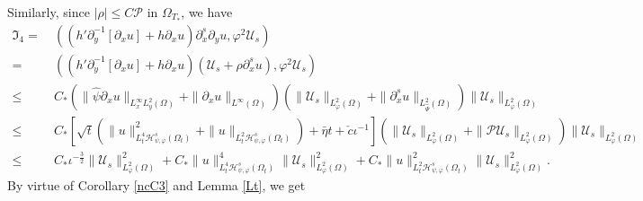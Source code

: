 \documentclass{amsart}
\numberwithin{equation}{section}
\begin{document}
Similarly, since $|\rho|\leq C\mathcal{P}$ in $\Omega_{T_{*}}$, we have
\begin{align*}
\mathfrak{I}_{4}
=&~((h'\partial_{y}^{-1}[\partial_{x}u]+h\partial_{x}u)\partial_{x}^{s}\partial_{y}u,\varphi^{2}\mathcal{U}_{s})\\
=&~((h'\partial_{y}^{-1}[\partial_{x}u]+h\partial_{x}u)(\mathcal{U}_{s}+\rho\partial_{x}^{s}u),\varphi^{2}\mathcal{U}_{s})\\
\leq&~C_{*}\left(\|\hat{\psi}\partial_{x}u\|_{L_{x}^{\infty}L_{y}^{2}(\Omega)}+\|\partial_{x}u\|_{L^{\infty}(\Omega)}\right)
           \left(\|\mathcal{U}_{s}\|_{L_{\varphi}^{2}(\Omega)}+\|\partial_{x}^{s}u\|_{L_{\hat{\Psi}}^{2}(\Omega)}\right)
           \|\mathcal{U}_{s}\|_{L_{\varphi}^{2}(\Omega)}\\
\leq&~C_{*}\left[\sqrt{t}\left(\|u\|_{L_{t}^{4}\mathcal{H}_{\psi,\varphi}^{s}(\Omega_{t})}^{2}+\|u\|_{L_{t}^{2}\mathcal{H}_{\psi,\varphi}^{s}(\Omega_{t})}\right)
                 +\bar{\eta}t+\check{c}\iota^{-1}\right]
           \left(\|\mathcal{U}_{s}\|_{L_{\varphi}^{2}(\Omega)}+\|\mathcal{P}\mathcal{U}_{s}\|_{L_{\varphi}^{2}(\Omega)}\right)
           \|\mathcal{U}_{s}\|_{L_{\varphi}^{2}(\Omega)}\\
\leq&~C_{*}\iota^{-\frac{3}{2}}\|\mathcal{U}_{s}\|_{L_{\varphi}^{2}(\Omega)}^{2}
     +C_{*}\|u\|_{L_{t}^{4}\mathcal{H}_{\psi,\varphi}^{s}(\Omega_{t})}^{4}\|\mathcal{U}_{s}\|_{L_{\varphi}^{2}(\Omega)}^{2}
     +C_{*}\|u\|_{L_{t}^{2}\mathcal{H}_{\psi,\varphi}^{s}(\Omega_{t})}^{2}\|\mathcal{U}_{s}\|_{L_{\varphi}^{2}(\Omega)}^{2}.
\end{align*}
By virtue of Corollary \ref{ncC3} and Lemma \ref{Lt}, we get
\end{document}
